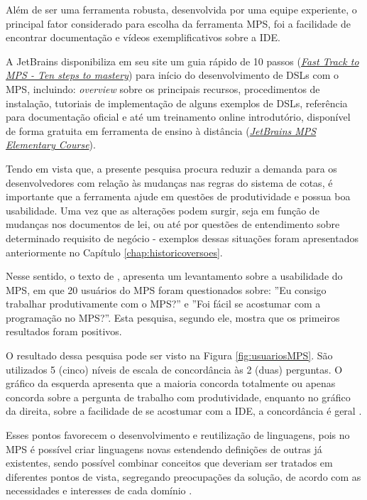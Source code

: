 Além de ser uma ferramenta robusta, desenvolvida por uma equipe experiente, o principal fator considerado para escolha da ferramenta \gls{MPS}, foi a facilidade de encontrar documentação e vídeos exemplificativos sobre a \gls{IDE}. 

A JetBrains disponibiliza em seu site um guia rápido de 10 passos (\href{www.jetbrains.com/help/mps/fast-track-to-mps.html}{\textit{Fast Track to MPS - Ten steps to mastery}}) para início do desenvolvimento de \gls{DSL}s com o \gls{MPS}, incluindo: \textit{overview} sobre os principais recursos, procedimentos de instalação, tutoriais de implementação de alguns exemplos de \gls{DSL}s, referência para documentação oficial e até um treinamento online introdutório, disponível de forma gratuita em ferramenta de ensino à distância (\href{https://stepik.org/course/37360/promo}{\textit{JetBrains MPS Elementary Course}}).  

Tendo em vista que, a presente pesquisa procura reduzir a demanda para os desenvolvedores com relação às mudanças nas regras do sistema de cotas, é importante que a ferramenta ajude em questões de produtividade e possua boa usabilidade. Uma vez que as alterações podem surgir, seja em função de mudanças nos documentos de lei, ou até por questões de entendimento sobre determinado requisito de negócio - exemplos dessas situações foram apresentados anteriormente no Capítulo \ref{chap:historicoversoes}.

Nesse sentido, o texto de  , apresenta um levantamento sobre a usabilidade do \gls{MPS}, em que 20 usuários do \gls{MPS} foram questionados sobre: ''Eu consigo trabalhar produtivamente com o MPS?'' e ''Foi fácil se acostumar com a programação no MPS?''. Esta pesquisa, segundo ele, mostra que os primeiros resultados foram positivos. 

O resultado dessa pesquisa pode ser visto na Figura \ref{fig:usuariosMPS}. São utilizados 5 (cinco) níveis de escala de concordância às 2 (duas) perguntas. O gráfico da esquerda apresenta que a maioria concorda totalmente ou apenas concorda sobre a pergunta de trabalho com produtividade, enquanto no gráfico da direita, sobre a facilidade de se acostumar com a \gls{IDE}, a concordância é geral \cite{voelter2014generic}.






Esses pontos favorecem o desenvolvimento e reutilização de linguagens, pois no \gls{MPS} é possível criar linguagens novas estendendo definições de outras já existentes, sendo possível combinar conceitos que deveriam ser tratados em diferentes pontos de vista, segregando preocupações da solução, de acordo com as necessidades e interesses de cada domínio \cite{volter2011language}.


